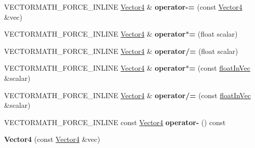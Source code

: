 \begin{DoxyCompactItemize}
V\+E\+C\+T\+O\+R\+M\+A\+T\+H\+\_\+\+F\+O\+R\+C\+E\+\_\+\+I\+N\+L\+I\+NE \hyperlink{classVectormath_1_1Aos_1_1Vector4}{Vector4} \& {\bfseries operator-\/=} (const \hyperlink{classVectormath_1_1Aos_1_1Vector4}{Vector4} \&vec)
\item 
\mbox{\label{classVectormath_1_1Aos_1_1Vector4_ae10f2e976fe6ff7df2e1f233ecdc5149}} 
V\+E\+C\+T\+O\+R\+M\+A\+T\+H\+\_\+\+F\+O\+R\+C\+E\+\_\+\+I\+N\+L\+I\+NE \hyperlink{classVectormath_1_1Aos_1_1Vector4}{Vector4} \& {\bfseries operator$\ast$=} (float scalar)
\item 
\mbox{\label{classVectormath_1_1Aos_1_1Vector4_a2510ee14cac26209bccebe162c975cc9}} 
V\+E\+C\+T\+O\+R\+M\+A\+T\+H\+\_\+\+F\+O\+R\+C\+E\+\_\+\+I\+N\+L\+I\+NE \hyperlink{classVectormath_1_1Aos_1_1Vector4}{Vector4} \& {\bfseries operator/=} (float scalar)
\item 
\mbox{\label{classVectormath_1_1Aos_1_1Vector4_a8652ccba522d8d33ade7af7ddd6ae7c7}} 
V\+E\+C\+T\+O\+R\+M\+A\+T\+H\+\_\+\+F\+O\+R\+C\+E\+\_\+\+I\+N\+L\+I\+NE \hyperlink{classVectormath_1_1Aos_1_1Vector4}{Vector4} \& {\bfseries operator$\ast$=} (const \hyperlink{classVectormath_1_1floatInVec}{float\+In\+Vec} \&scalar)
\item 
\mbox{\label{classVectormath_1_1Aos_1_1Vector4_a79dfe968929d129bc9175b9fec4ab707}} 
V\+E\+C\+T\+O\+R\+M\+A\+T\+H\+\_\+\+F\+O\+R\+C\+E\+\_\+\+I\+N\+L\+I\+NE \hyperlink{classVectormath_1_1Aos_1_1Vector4}{Vector4} \& {\bfseries operator/=} (const \hyperlink{classVectormath_1_1floatInVec}{float\+In\+Vec} \&scalar)
\item 
\mbox{\label{classVectormath_1_1Aos_1_1Vector4_ad4f6f5e0d65c41bec8a04cfbd280948c}} 
V\+E\+C\+T\+O\+R\+M\+A\+T\+H\+\_\+\+F\+O\+R\+C\+E\+\_\+\+I\+N\+L\+I\+NE const \hyperlink{classVectormath_1_1Aos_1_1Vector4}{Vector4} {\bfseries operator-\/} () const
\item 
\mbox{\label{classVectormath_1_1Aos_1_1Vector4_ae1761e06fb715a8534084780ee52a438}} 
{\bfseries Vector4} (const \hyperlink{classVectormath_1_1Aos_1_1Vector4}{Vector4} \&vec)
\item 

\end{DoxyCompactItemize}

